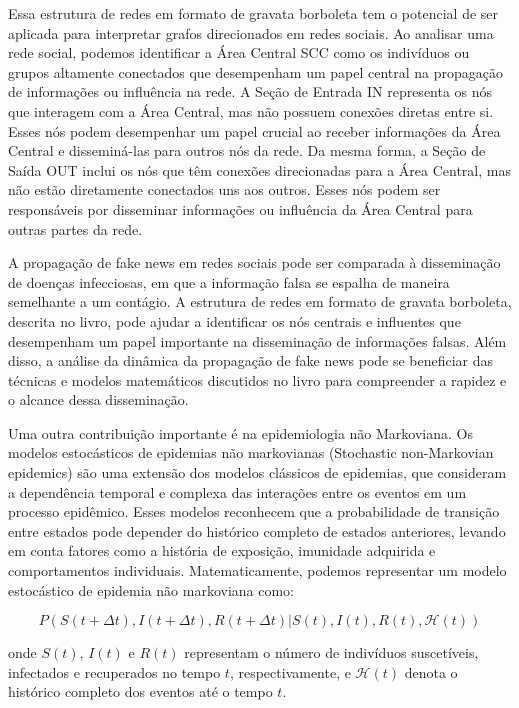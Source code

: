 Essa estrutura de redes em formato de gravata borboleta tem o potencial de ser aplicada para interpretar grafos direcionados em redes sociais. Ao analisar uma rede social, podemos identificar a Área Central {SCC} como os indivíduos ou grupos altamente conectados que desempenham um papel central na propagação de informações ou influência na rede. A Seção de Entrada {IN} representa os nós que interagem com a Área Central, mas não possuem conexões diretas entre si. Esses nós podem desempenhar um papel crucial ao receber informações da Área Central e disseminá-las para outros nós da rede. Da mesma forma, a Seção de Saída {OUT} inclui os nós que têm conexões direcionadas para a Área Central, mas não estão diretamente conectados uns aos outros. Esses nós podem ser responsáveis por disseminar informações ou influência da Área Central para outras partes da rede.

A propagação de fake news em redes sociais pode ser comparada à disseminação de doenças infecciosas, em que a informação falsa se espalha de maneira semelhante a um contágio. A estrutura de redes em formato de gravata borboleta, descrita no livro, pode ajudar a identificar os nós centrais e influentes que desempenham um papel importante na disseminação de informações falsas. Além disso, a análise da dinâmica da propagação de fake news pode se beneficiar das técnicas e modelos matemáticos discutidos no livro para compreender a rapidez e o alcance dessa disseminação.

Uma outra contribuição importante é na epidemiologia não Markoviana. Os modelos estocásticos de epidemias não markovianas (Stochastic non-Markovian epidemics) são uma extensão dos modelos clássicos de epidemias, que consideram a dependência temporal e complexa das interações entre os eventos em um processo epidêmico. Esses modelos reconhecem que a probabilidade de transição entre estados pode depender do histórico completo de estados anteriores, levando em conta fatores como a história de exposição, imunidade adquirida e comportamentos individuais. Matematicamente, podemos representar um modelo estocástico de epidemia não markoviana como:

\begin{equation}
	P(S(t+\Delta t), I(t+\Delta t), R(t+\Delta t)|S(t), I(t), R(t), \mathcal{H}(t))
\end{equation}

onde $S(t)$, $I(t)$ e $R(t)$ representam o número de indivíduos suscetíveis, infectados e recuperados no tempo $t$, respectivamente, e $\mathcal{H}(t)$ denota o histórico completo dos eventos até o tempo $t$.

